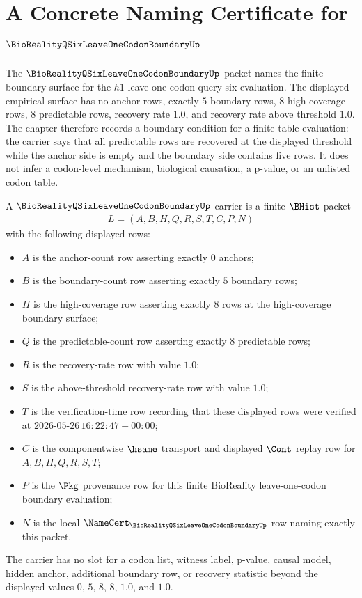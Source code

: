 \chapter{A Concrete Naming Certificate for $\BioRealityQSixLeaveOneCodonBoundaryUp$}
\label{ch:concrete-instances-bioreality-q-six-leave-one-codon-boundary-namecert}

The $\BioRealityQSixLeaveOneCodonBoundaryUp$ packet names the finite boundary surface for the $h1$ leave-one-codon query-six evaluation. The displayed empirical surface has no anchor rows, exactly $5$ boundary rows, $8$ high-coverage rows, $8$ predictable rows, recovery rate $1.0$, and recovery rate above threshold $1.0$. The chapter therefore records a boundary condition for a finite table evaluation: the carrier says that all predictable rows are recovered at the displayed threshold while the anchor side is empty and the boundary side contains five rows. It does not infer a codon-level mechanism, biological causation, a p-value, or an unlisted codon table.

\begin{definition}
\label{def:bioreality-q-six-leave-one-codon-boundary-carrier}
A $\BioRealityQSixLeaveOneCodonBoundaryUp$ carrier is a finite $\BHist$ packet
$$
\begin{gathered}
L=(A,B,H,Q,R,S,T,C,P,N)
\end{gathered}
$$
with the following displayed rows:
\begin{itemize}
\item $A$ is the anchor-count row asserting exactly $0$ anchors;
\item $B$ is the boundary-count row asserting exactly $5$ boundary rows;
\item $H$ is the high-coverage row asserting exactly $8$ rows at the high-coverage boundary surface;
\item $Q$ is the predictable-count row asserting exactly $8$ predictable rows;
\item $R$ is the recovery-rate row with value $1.0$;
\item $S$ is the above-threshold recovery-rate row with value $1.0$;
\item $T$ is the verification-time row recording that these displayed rows were verified at $2026$-$05$-$26\,16\!:22\!:47+00\!:00$;
\item $C$ is the componentwise $\hsame$ transport and displayed $\Cont$ replay row for $A,B,H,Q,R,S,T$;
\item $P$ is the $\Pkg$ provenance row for this finite BioReality leave-one-codon boundary evaluation;
\item $N$ is the local $\NameCert_{\BioRealityQSixLeaveOneCodonBoundaryUp}$ row naming exactly this packet.
\end{itemize}
The carrier has no slot for a codon list, witness label, p-value, causal model, hidden anchor, additional boundary row, or recovery statistic beyond the displayed values $0$, $5$, $8$, $8$, $1.0$, and $1.0$.
\end{definition}

